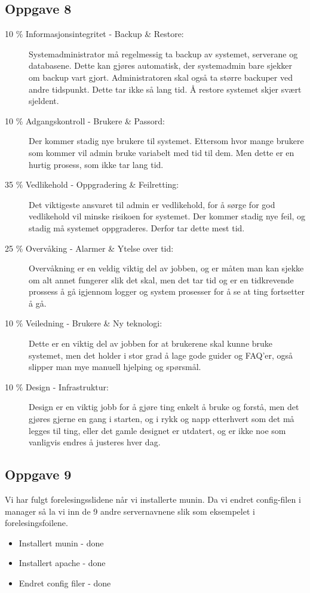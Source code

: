 \documentclass[a4paper, norsk, 12pt]{article}
\begin{document}
\subsection{Oppgave 8}
\begin{description}
\item[10 \% Informasjonsintegritet - Backup \& Restore:]
 Systemadministrator må regelmessig ta backup av systemet, serverane og databasene. Dette kan gjøres automatisk, der systemadmin bare sjekker om backup vart gjort. Administratoren skal også ta større backuper ved andre tidspunkt. Dette tar ikke så lang tid. Å restore systemet skjer svært sjeldent.

\item[10 \% Adgangskontroll - Brukere \& Passord:]
Der kommer stadig nye brukere til systemet. Ettersom hvor mange brukere som kommer vil admin bruke variabelt med tid til dem. Men dette er en hurtig prosess, som ikke tar lang tid.

\item[35 \% Vedlikehold - Oppgradering \& Feilretting:]
Det viktigeste ansvaret til admin er vedlikehold, for å sørge for god vedlikehold vil minske risikoen for systemet. Der kommer stadig nye feil, og stadig må systemet oppgraderes. Derfor tar dette mest tid.

\item[25 \% Overvåking - Alarmer \& Ytelse over tid:]
Overvåkning er en veldig viktig del av jobben, og er måten man kan sjekke om alt annet fungerer slik det skal, men det tar tid og er en tidkrevende prossess å gå igjennom logger og system prosesser for å se at ting fortsetter å gå.

\item[10 \% Veiledning - Brukere \& Ny teknologi:]
Dette er en viktig del av jobben for at brukerene skal kunne bruke systemet, men det holder i stor grad å lage gode guider og FAQ’er, også slipper man mye manuell hjelping og spørsmål.

\item[10 \% Design - Infrastruktur:]
Design er en viktig jobb for å gjøre ting enkelt å bruke og forstå, men det gjøres gjerne en gang i starten, og i rykk og napp etterhvert som det må legges til ting, eller det gamle designet er utdatert, og er ikke noe som vanligvis endres å justeres hver dag.
\end{description}

\subsection{Oppgave 9}
Vi har fulgt forelesingsslidene når vi installerte munin. Da vi endret config-filen i manager så la vi inn de 9 andre servernavnene slik som eksempelet i forelesingsfoilene.
\begin{itemize}
\item Installert munin - done
\item Installert apache - done
\item Endret config filer - done
\end{itemize}
\end{document}
